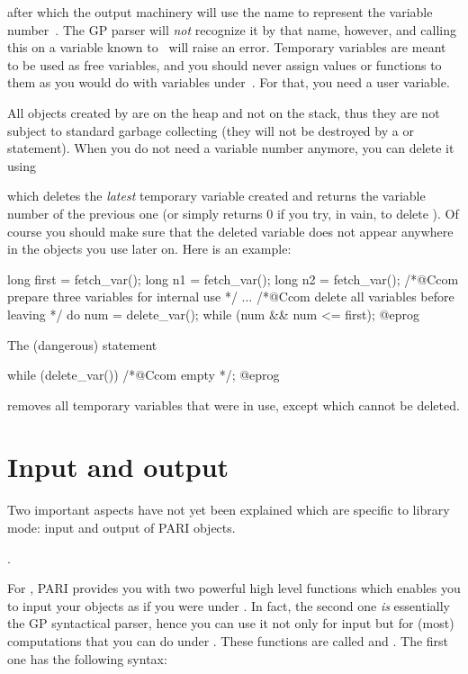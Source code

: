 
\noindent after which the output machinery will use the name  to
represent the variable number~. The GP parser will \emph{not}
recognize it by that name, however, and calling this on a variable known
to~ will raise an error. Temporary variables are meant to be used as free
variables, and you should never assign values or functions to them as you
would do with variables under~. For that, you need a user variable.

All objects created by  are on the heap and not on the stack,
thus they are not subject to standard garbage collecting (they will not be
destroyed by a  or  statement). When you do not
need a variable number anymore, you can delete it using


\noindent which deletes the \emph{latest} temporary variable created and
returns the variable number of the previous one (or simply returns 0 if you
try, in vain, to delete ). Of course you should make sure that
the deleted variable does not appear anywhere in the objects you use later
on. Here is an example:

\bprog
{
  long first = fetch_var();
  long n1 = fetch_var();
  long n2 = fetch_var(); /*@Ccom prepare three variables for internal use */
  ...
  /*@Ccom delete all variables before leaving */
  do { num = delete_var(); } while (num && num <= first);
}@eprog

\noindent
The (dangerous) statement

\bprog
while (delete_var()) /*@Ccom empty */;
@eprog

\noindent removes all temporary variables that were in use, except
 which cannot be deleted.

\section{Input and output}

\noindent
Two important aspects have not yet been explained which are specific to
library mode: input and output of PARI objects.

.

\noindent
For , PARI provides you with two powerful high level functions
which enables you to input your objects as if you were under . In fact,
the second one \emph{is} essentially the GP syntactical parser, hence you
can use it not only for input but for (most) computations that you can do
under . These functions are called  and . The
first one has the following syntax:\label{se:flisexpr}

